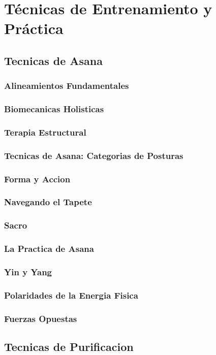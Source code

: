 \documentclass[a4paper]{article}
\begin{document}
\section{T\'{e}cnicas de Entrenamiento y Pr\'{a}ctica}
\subsection{Tecnicas de Asana}
\subsubsection{Alineamientos Fundamentales}
\subsubsection{Biomecanicas Holisticas}
\subsubsection{Terapia Estructural}
\subsubsection{Tecnicas de Asana: Categorias de Posturas}
\subsubsection{Forma y Accion}
\subsubsection{Navegando el Tapete}
\subsubsection{Sacro}
\subsubsection{La Practica de Asana}
\subsubsection{Yin y Yang}
\subsubsection{Polaridades de la Energia Fisica}
\subsubsection{Fuerzas Opuestas}
\subsection{Tecnicas de Purificacion}
\end{document}
